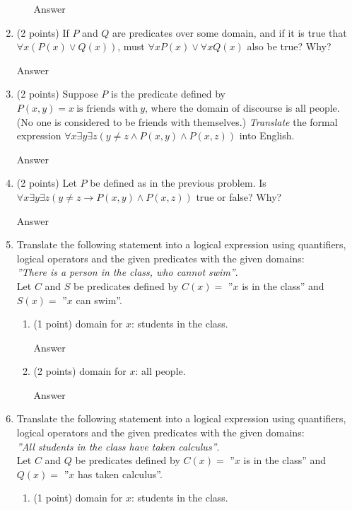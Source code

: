 \documentclass{article}
\begin{document}
\begin{enumerate}
\begin{enumerate}
            \color{blue}
                Answer
            \color{black}
        \end{enumerate}
        
    \item (2 points) If $P$ and $Q$ are predicates over some domain, and if it is true that $\forall x(P (x) \vee Q(x))$, must $\forall xP (x) \vee \forall xQ(x)$ also be true? Why?
    
    \color{blue}
        Answer
    \color{black}
    
    \item (2 points) Suppose $P$ is the predicate defined by $P(x, y) = x\ \text{is friends with}\ y$, where the domain of discourse is all people. (No one is considered to be friends with themselves.) \textit{Translate} the formal expression $\forall x\exists y\exists z(y \neq z \wedge P(x, y) \wedge P(x, z))$ into English.
    
    \color{blue}
        Answer
    \color{black}
    
    \item (2 points) Let $P$ be defined as in the previous problem. Is $\forall x\exists y\exists z(y \neq z \rightarrow P(x, y) \wedge P(x, z))$ true or false? Why? 
    
    \color{blue}
        Answer
    \color{black}
    
    \item Translate the following statement into a logical expression using quantifiers, logical operators and the given predicates with the given domains: 
    \\\textit{”There is a person in the class, who cannot swim”}.
    \\Let $C$ and $S$ be predicates defined by $C(x) =$ ”$x$ is in the class” and $S(x) =$ ”$x$ can swim”.
    \begin{enumerate}
        \item (1 point) domain for $x$: students in the class.
    
        \color{blue}
            Answer
        \color{black}
        
        \item (2 points) domain for $x$: all people.
    
        \color{blue}
            Answer
        \color{black}
    \end{enumerate}
    
    \item Translate the following statement into a logical expression using quantifiers, logical operators and the given predicates with the given domains:
    \\\textit{”All students in the class have taken calculus”}.
    \\Let $C$ and $Q$ be predicates defined by $C(x) =$ ”$x$ is in the class” and
    $Q(x) =$ ”$x$ has taken calculus”.
    \begin{enumerate}
        \item (1 point) domain for $x$: students in the class.
    

\end{enumerate}
\end{enumerate}
\end{document}
